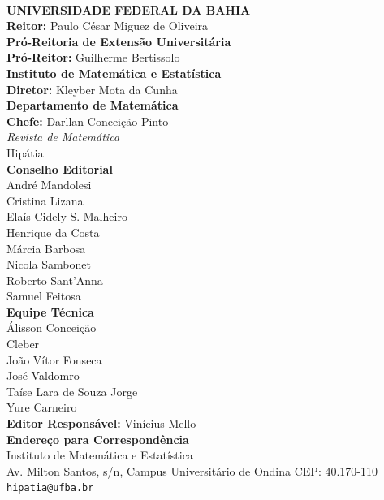 \documentclass[onecolumn]{hipatia}
\begin{document}
\newpage
~
\newpage
\pagecolor{white}
\begin{center}
  \textbf{UNIVERSIDADE FEDERAL DA BAHIA} \\
  \textbf{Reitor:} Paulo César Miguez de Oliveira\\
\vspace*{0.5cm}
  \textbf{Pró-Reitoria de Extensão Universitária} \\
  \textbf{Pró-Reitor:} Guilherme Bertissolo\\
  \vspace*{0.5cm}  
  \textbf{Instituto de Matemática e Estatística} \\
  \textbf{Diretor:} Kleyber Mota da Cunha\\
  \vspace*{0.5cm}
  \textbf{Departamento de Matemática} \\
  \textbf{Chefe:} Darllan Conceição Pinto\\
\vspace*{2cm}
{\fontsize{23}{23}\selectfont\textit{Revista de Matemática}}\\
\vspace*{0.3cm}
{\fontsize{72}{72}\selectfont Hipátia}\\
\vspace*{0.8cm}
\textbf{Conselho Editorial} \\
André Mandolesi\\
Cristina Lizana\\
Elaís Cidely S. Malheiro\\
Henrique da Costa\\
Márcia Barbosa\\
Nicola Sambonet\\
Roberto Sant'Anna\\
Samuel Feitosa\\
\vspace*{0.2cm}
\textbf{Equipe Técnica} \\
Álisson Conceição\\
Cleber \\
João Vítor Fonseca \\
José Valdomro \\
Taíse Lara de Souza Jorge\\
Yure Carneiro\\
\vspace*{0.5cm}
\textbf{Editor Responsável:} Vinícius Mello  \\

\vspace*{0.7cm}
\textbf{Endereço para Correspondência}\\
Instituto de Matemática e Estatística\\
Av. Milton Santos, s/n, Campus Universitário de Ondina CEP: 40.170-110\\
\texttt{hipatia@ufba.br}\\


\end{center}
\end{document}
